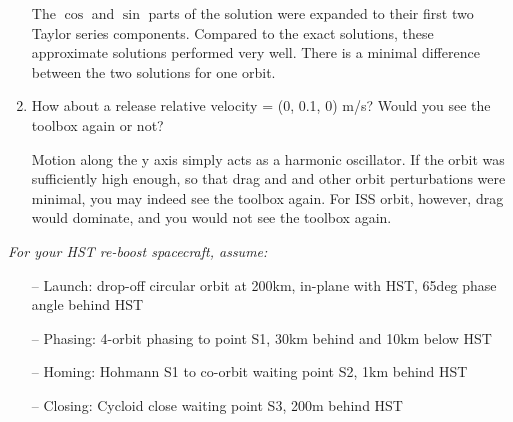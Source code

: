 \documentclass[onecolumn,10pt]{jhwhw}
\begin{document}
\begin{enumerate}
The $\cos$ and $\sin$ parts of the solution were expanded to their first two Taylor series components. Compared to the exact solutions, these approximate solutions performed very well. There is a minimal difference between the two solutions for one orbit.
\item How about a release relative velocity = (0, 0.1, 0) m/s? Would you see the toolbox again or not?

Motion along the y axis simply acts as a harmonic oscillator. If the orbit was sufficiently high enough, so that drag and and other orbit perturbations were minimal, you may indeed see the toolbox again. For ISS orbit, however, drag would dominate, and you would not see the toolbox again.
\end{enumerate}
\clearpage

\problem{}
\textit{For your HST re-boost spacecraft, assume:}
\begin{itemize}
\itemsep0em
\item[--] Launch: drop-off circular orbit at 200km, in-plane with HST, 65deg phase angle behind HST
\item[--] Phasing: 4-orbit phasing to point S1, 30km behind and 10km below HST
\item[--] Homing: Hohmann S1 to co-orbit waiting point S2, 1km behind HST
\item[--] Closing: Cycloid close waiting point S3, 200m behind HST
\end{itemize}
\end{document}
